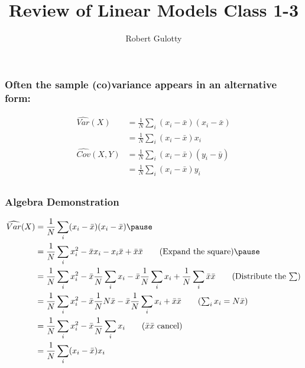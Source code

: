 \documentclass[aspectratio=169, handout]{beamer}
\title[PLSC 30700]{Review of Linear Models Class 1-3}
\author{Robert Gulotty}
\institute[Chicago]{University of Chicago}
\numberwithin{equation}{section}
\begin{document}
\begin{frame}
\maketitle
\end{frame}



\begin{frame}
\frametitle{Often the sample (co)variance appears in an alternative form:} 
\small{
\begin{align*}
\widehat{Var}(X)&=\frac{1}{N}\sum_i(x_i-\bar{x})(x_i-\bar{x}) \\
& =\frac{1}{N}\sum_i(x_i-\bar{x})x_i\\
 \widehat{Cov}(X,Y)&=\frac{1}{N}\sum_i(x_i-\bar{x})(y_i-\bar{y}) \\
& =\frac{1}{N}\sum_i(x_i-\bar{x})y_i\\
 \end{align*}}
\end{frame}

\begin{frame}
\frametitle{Algebra Demonstration} 
\small{
\begin{align*}
\widehat{Var}(X)&=\frac{1}{N}\sum_i(x_i-\bar{x})(x_i-\bar{x})  \pause \\
& =\frac{1}{N}\sum_ix_i^2-\bar{x}x_i-x_i\bar{x}+\bar{x}\bar{x}  \tag{Expand the square} \pause \\
& =\frac{1}{N}\sum_ix_i^2-\bar{x}\frac{1}{N}\sum_ix_i-\bar{x}\frac{1}{N}\sum_ix_i+\frac{1}{N}\sum_i\bar{x}\bar{x} \tag{Distribute the $\sum$} \\
& =\frac{1}{N}\sum_ix_i^2-\bar{x}\frac{1}{N}N\bar{x}-\bar{x}\frac{1}{N}\sum_ix_i+\bar{x}\bar{x} \tag{$\sum_i x_i=N\bar{x}$}\\
& =\frac{1}{N}\sum_ix_i^2-\bar{x}\frac{1}{N}\sum_ix_i \tag{$\bar{x}\bar{x}$ cancel}\\
& =\frac{1}{N}\sum_i(x_i-\bar{x})x_i\\
 \end{align*}}
\end{frame}
\end{document}
